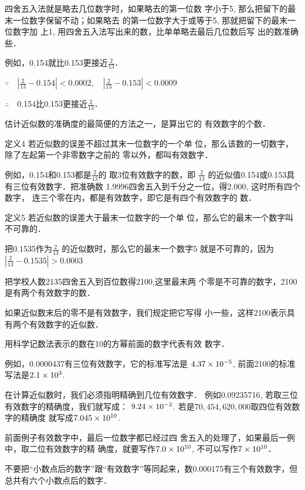 四舍五入法就是略去几位数字时，如果略去的第一位数
字小于5, 那么把留下的最末一位数字保留不动；如果略去
的第一位数字大于或等于5, 那就把留下的最末一位数字加
上1, 用四舍五入法写出来的数，比单单略去最后几位数后写
出的数准确些．

例如，0.154就比0.153更接近$\frac{2}{13}$．

$\because\quad \left|\frac{2}{13}-0.154\right|<0.0002,\quad \left|\frac{2}{13}-0.153\right|<0.0009$

$\therefore\quad $0.154比0.153更接近$\frac{2}{13}$．

估计近似数的准确度的最简便的方法之一，是算出它的
有效数字的个数．

\begin{blk}{定义4}
    若近似数的误差不超过其末一位数字的一个单
位，那么该数的一切数字，除了左起第一个非零数字之前的
零以外，都叫有效数字．
\end{blk}


例如，0.154和0.153都是$\frac{2}{13}$的
取3位有效数字的数，即
$\frac{2}{13}$
的近似值0.154或0.153具有三位有效数字．把准确数
1.9996四舍五入到千分之一位，得2.000, 这时所有四个数字，
连三个零在内，都是有效数字，即它是有四个有效数字的
数．

\begin{blk}{定义5}
    若近似数的误差大于最末一位数字的一个单
    位，那么它的最末一个数字叫不可靠的．  
\end{blk}

把0.1535作为$\frac{2}{13}$
的近似数时，那么它的最末一个数字5
就是不可靠的，因为
$\left|\frac{2}{13}-0.1535\right|>0.0003$

把学校人数2135四舍五入到百位数得2100,这里最末两
个零是不可靠的数字，2100是有两个有效数字的数．

如果近似数末后的零不是有效数字，我们规定把它写得
小一些，这样21{\small00}表示具有两个有效数字的近似数．

用科学记数法表示的数在10的方幂前面的数字代表有效
数字．

例如，0.0000437有三位有效数字，它的标准写法是
$4.37\times10^{-5}$, 前面2100的标准写法是$2.1\times10^3$.

在计算近似数时，我们必须指明精确到几位有效数字．
例如0.09235716, 若取三位有效数字的精确度，我们就写成：
$9.24\times10^{-2}$. 若是$70,454,620,000$取四位有效数字的精确度
就写成$7.045\times10^{10}$.

\begin{rmk}
前面例子有效数字中，最后一位数字都已经过四
舍五入的处理了，如果最后一例中，取二位有效数字的精
确度，就要写作$7.0\times10^{10}$, 不可以写作$7\times10^{10}$．  

不要把“小数点后的数字”跟“有效数字”等同起来，数0.000175有三个有效数字，但总共有六个小数点后的数字．
\end{rmk}

